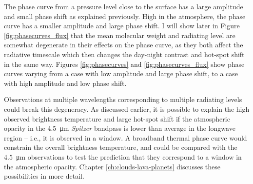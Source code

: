 



The phase curve from a pressure level close to the surface has a large amplitude and small phase shift as explained previously. High in the atmosphere, the phase curve has a smaller amplitude and large phase shift. I will show later in Figure \ref{fig:phasecurves_flux} that the mean molecular weight and radiating level are somewhat degenerate in their effects on the phase curve, as they both affect the radiative timescale which then changes the day-night contrast and hot-spot shift in the same way. Figures \ref{fig:phasecurves} and \ref{fig:phasecurves_flux} show phase curves varying from a case with low amplitude and large phase shift, to a case with high amplitude and low phase shift.


Observations at multiple wavelengths corresponding to multiple radiating levels could break this degeneracy. As discussed earlier, it is possible to explain the high observed brightness temperature and large hot-spot shift if the atmospheric opacity in the \SI{4.5}{\micro\metre} \textit{Spitzer} bandpass is lower than average in the longwave region -- i.e., it is observed in a window. A broadband thermal phase curve would constrain the overall brightness temperature, and could be compared with the \SI{4.5}{\micro\metre} observations to test the prediction that they correspond to a window in the atmospheric opacity. Chapter \ref{ch:clouds-lava-planets} discusses these possibilities in more detail.

